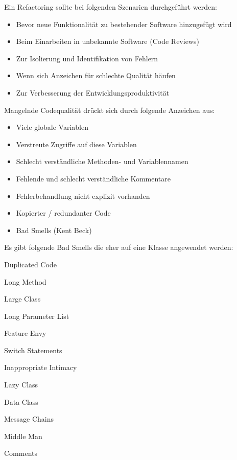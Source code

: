 Ein Refactoring sollte bei folgenden Szenarien durchgeführt werden:
\begin{itemize}
	\item Bevor neue Funktionalität zu bestehender Software hinzugefügt wird
	\item Beim Einarbeiten in unbekannte Software (Code Reviews)
	\item Zur Isolierung und Identifikation von Fehlern
	\item Wenn sich Anzeichen für schlechte Qualität häufen
	\item Zur Verbesserung der Entwicklungsproduktivität
\end{itemize}
Mangelnde Codequalität drückt sich durch folgende Anzeichen aus:
\begin{itemize}
	\item Viele globale Variablen
	\item Verstreute Zugriffe auf diese Variablen
	\item Schlecht verständliche Methoden- und Variablennamen
	\item Fehlende und schlecht verständliche Kommentare
	\item Fehlerbehandlung nicht explizit vorhanden
	\item Kopierter / redundanter Code
	\item Bad Smells (Kent Beck)
\end{itemize}
Es gibt folgende Bad Smells die eher auf eine Klasse angewendet werden:
\begin{multicols}{2}
\begin{description}
	\item Duplicated Code
	\item Long Method
	\item Large Class
	\item Long Parameter List
	\item Feature Envy
	\item Switch Statements
	\item Inappropriate Intimacy
	\item Lazy Class
	\item Data Class
	\item Message Chains
	\item Middle Man
	\item Comments
\end{description}
\end{multicols}

